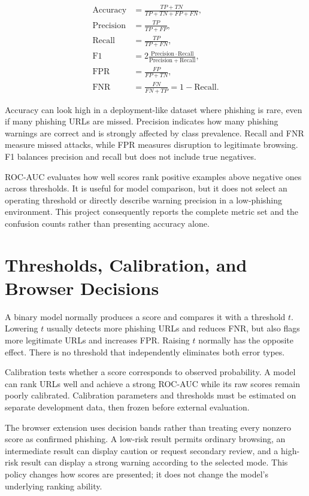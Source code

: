 \begin{align}
\mathrm{Accuracy} &= \frac{TP+TN}{TP+TN+FP+FN},\\
\mathrm{Precision} &= \frac{TP}{TP+FP},\\
\mathrm{Recall} &= \frac{TP}{TP+FN},\\
\mathrm{F1} &= 2\frac{\mathrm{Precision}\cdot\mathrm{Recall}}
{\mathrm{Precision}+\mathrm{Recall}},\\
\mathrm{FPR} &= \frac{FP}{FP+TN},\\
\mathrm{FNR} &= \frac{FN}{FN+TP}=1-\mathrm{Recall}.
\end{align}

Accuracy can look high in a deployment-like dataset where phishing is rare,
even if many phishing URLs are missed. Precision indicates how many phishing
warnings are correct and is strongly affected by class prevalence. Recall and
FNR measure missed attacks, while FPR measures disruption to legitimate
browsing. F1 balances precision and recall but does not include true negatives.

ROC-AUC evaluates how well scores rank positive examples above negative ones
across thresholds. It is useful for model comparison, but it does not select an
operating threshold or directly describe warning precision in a low-phishing
environment. This project consequently reports the complete metric set and the
confusion counts rather than presenting accuracy alone.

\section{Thresholds, Calibration, and Browser Decisions}

A binary model normally produces a score and compares it with a threshold
$t$. Lowering $t$ usually detects more phishing URLs and reduces FNR, but also
flags more legitimate URLs and increases FPR. Raising $t$ normally has the
opposite effect. There is no threshold that independently eliminates both error
types.

Calibration tests whether a score corresponds to observed probability. A model
can rank URLs well and achieve a strong ROC-AUC while its raw scores remain
poorly calibrated. Calibration parameters and thresholds must be estimated on
separate development data, then frozen before external evaluation.

The browser extension uses decision bands rather than treating every nonzero
score as confirmed phishing. A low-risk result permits ordinary browsing, an
intermediate result can display caution or request secondary review, and a
high-risk result can display a strong warning according to the selected mode.
This policy changes how scores are presented; it does not change the model's
underlying ranking ability.

